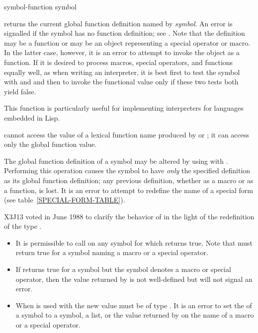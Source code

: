 \begin{defun}[Function]
symbol-function symbol

 returns the current global function definition
named by \emph{symbol}.  An error is signalled if the symbol has no function
definition; see .  Note that the definition may be a
function or may be an object representing a special operator or macro.
In the latter case, however, it is an error
to attempt to invoke the object as a function.
If it is desired to process macros, special operators, and functions
equally well, as when writing an interpreter,
it is best first to test the symbol with 
and 
and then to invoke the functional value only if these
two tests both yield false.

This function is particularly useful for implementing interpreters
for languages embedded in Lisp.

 cannot access the value of a lexical function name
produced by  or ; it can access only
the global function value.

The global function definition of a symbol may be altered
by using  with .
Performing this operation causes the symbol to have \emph{only} the
specified definition as its global function definition; any previous
definition, whether as a macro or as a function, is lost.
It is an error to attempt to redefine the name of a special
form (see table~\ref{SPECIAL-FORM-TABLE}).

\begin{newer}
X3J13 voted in June 1988  to clarify the behavior
of  in the light of the redefinition of the type .
\begin{itemize}
\item It is permissible to call 
    on any symbol for which  returns true.
 Note that  must return true for a symbol naming a macro or
    a special operator.

\item If  returns true for a symbol
        but the symbol denotes a macro or special operator,
        then the value returned by  is not well-defined
        but  will not signal an error. 

\item When  is used with 
 the new value must be of type .
	It is an error to set the  of a symbol to a
	symbol, a list, or the value returned by  on
	the name of a macro or a special operator.
\end{itemize}
\end{newer}
\end{defun}

